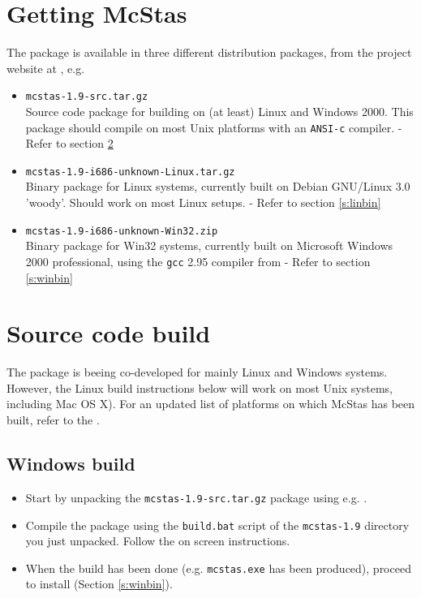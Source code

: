 \section{Getting McStas}
\label{s:obtain}
The  package is
available in three different distribution packages, from the project
website at
, e.g.
\begin{itemize}
\item{\texttt{mcstas-1.9-src.tar.gz}\\Source code package for
    building  on
    (at least) Linux and Windows 2000. This package should compile on
    most Unix platforms with an \texttt{ANSI-c} compiler. - Refer to section \ref{s:src}}
\item{\texttt{mcstas-1.9-i686-unknown-Linux.tar.gz}\\Binary package
  for Linux systems, currently built on Debian GNU/Linux 3.0 'woody'.
  Should work on most Linux setups.
 - Refer to section \ref{s:linbin}}
\item{\texttt{mcstas-1.9-i686-unknown-Win32.zip}\\Binary package
  for Win32 systems, currently built on Microsoft Windows 2000
  professional, using the \texttt{gcc} 2.95 compiler from
   - Refer to section \ref{s:winbin}}
\end{itemize}

\section{Source code build}
\label{s:src}
The  package is
beeing co-developed for mainly Linux and Windows systems. However, 
the Linux build instructions below will work on most Unix
systems, including Mac OS X). For an updated list of platforms on which McStas has been
built, refer to the .

\subsection{Windows build}
\begin{itemize}
\item{Start by unpacking the \texttt{mcstas-1.9-src.tar.gz} package using
e.g. .}
\item{Compile the  package using the \texttt{build.bat} script of the
\texttt{mcstas-1.9} directory you just unpacked. Follow the on screen
instructions.}
\item{When the build has been done (e.g. \texttt{mcstas.exe}
has been produced), proceed to install (Section \ref{s:winbin}).}
\end{itemize}

